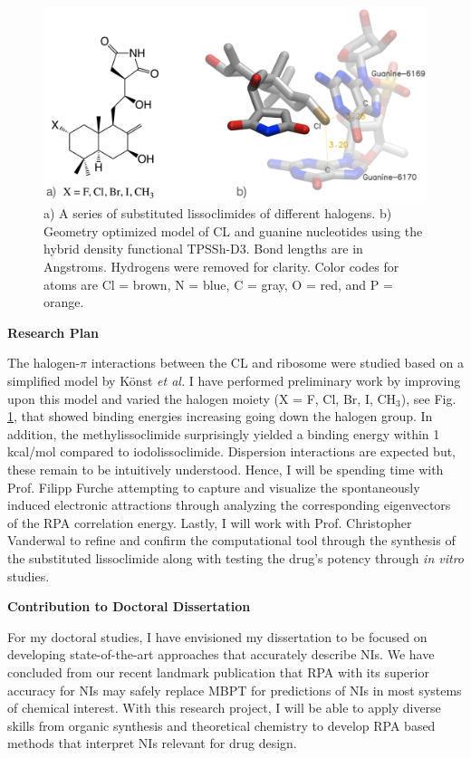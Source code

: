 \documentclass[11pt]{article}
\begin{document}
\begin{figure}
  \vspace{-20pt}
  \centering
  \includegraphics[scale=0.12]{combined.png}
  \caption{a) A series of substituted lissoclimides of different halogens.
    b) Geometry optimized model of CL and guanine nucleotides using the hybrid
    density functional TPSSh-D3.\autocite{Staroverov03JChemPhys119p12129,Grimme12ChemEurJ18p9955}
    Bond lengths are in Angstroms. Hydrogens were removed for clarity. Color codes
    for atoms are Cl = brown, N = blue, C = gray, O = red, and P = orange.\vspace{-11pt}}
  \label{fig:model}
\end{figure}

\textbf{Research Plan}

The halogen-$\pi$ interactions between the CL and ribosome were
studied based on a simplified model by K{\"o}nst \textit{et al.}\autocite{Konst2017}
I have performed preliminary work by improving upon this model and
varied the halogen moiety (X = F, Cl, Br, I, CH$_3$), see Fig. \ref{fig:model},
that showed binding energies increasing going down the halogen group. In addition,
the methylissoclimide surprisingly yielded a binding energy within 1
kcal/mol compared to iodolissoclimide. Dispersion interactions are expected
but, these remain to be intuitively understood. Hence, I will be spending time with
Prof. Filipp Furche attempting to capture and visualize the spontaneously induced
electronic attractions through analyzing the corresponding eigenvectors of the RPA
correlation energy. Lastly, I will work with Prof. Christopher Vanderwal to refine
and confirm the computational tool through the synthesis of the substituted lissoclimide
along with testing the drug's potency through \textit{in vitro} studies.

\textbf{Contribution to Doctoral Dissertation}

For my doctoral studies, I have envisioned my dissertation
to be focused on developing state-of-the-art approaches that accurately
describe NIs. We have concluded from our recent landmark publication that
RPA with its superior accuracy for NIs may safely replace MBPT for predictions
of NIs in most systems of chemical interest.\autocite{Nguyen20JChemTheoryComput16p2258}
With this research project, I will be able to apply diverse skills from
organic synthesis and theoretical chemistry to develop RPA based methods
that interpret NIs relevant for drug design.

\printbibliography
\end{document}
